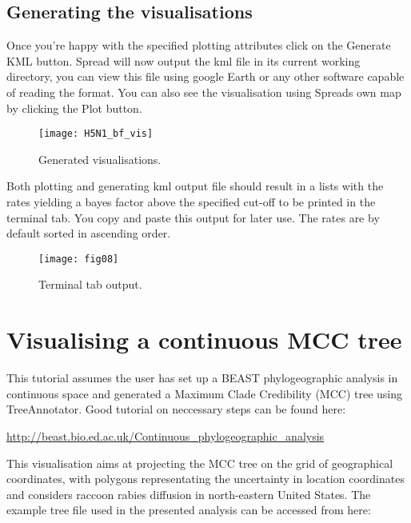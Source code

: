 \subsection{Generating the visualisations}

Once you're happy with the specified plotting attributes click on
the Generate KML button. Spread will now output the kml file in its
current working directory, you can view this file using google Earth
or any other software capable of reading the format. You can also
see the visualisation using Spreads own map by clicking the Plot button.

\begin{figure}[H]
\begin{centering}
\texttt{[image: H5N1\_bf\_vis]}
\caption{Generated visualisations.}
\label{fig:07}
\par\end{centering}
\end{figure}

Both plotting and generating kml output file should result in a lists
with the rates yielding a bayes factor above the specified cut-off
to be printed in the terminal tab. You copy and paste this output
for later use. The rates are by default sorted in ascending order.


\begin{figure}[H]
\begin{centering}
\texttt{[image: fig08]}
\caption{Terminal tab output.}
\label{fig:08}
\par\end{centering}
\end{figure}

\section{Visualising a continuous MCC tree}

This tutorial assumes the user has set up a BEAST phylogeographic
analysis in continuous space and generated a Maximum Clade Credibility
(MCC) tree using TreeAnnotator. Good tutorial on neccessary steps
can be found here:

\url{http://beast.bio.ed.ac.uk/Continuous_phylogeographic_analysis}

\noindent
This visualisation aims at projecting the MCC tree on the grid of
geographical coordinates, with polygons representating the uncertainty
in location coordinates and considers raccoon rabies diffusion in
north-eastern United States. 
The example tree file used in the presented analysis can be accessed
from here:

